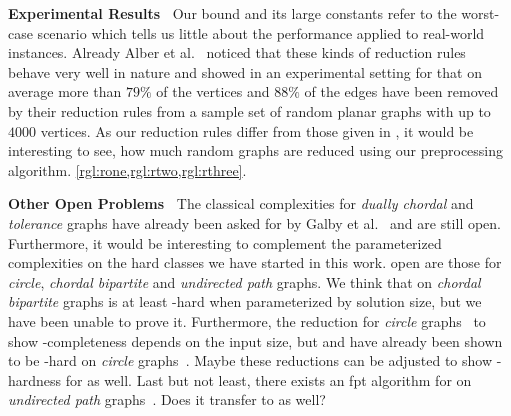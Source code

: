 \noindent \textbf{Experimental Results~}
Our bound and its large constants refer to the worst-case scenario which tells us little about the performance applied to real-world instances.
Already Alber et al.~\cite{Alber2004} noticed that these kinds of reduction rules behave very well in nature and showed in an experimental setting for \pdom that on average more than $79\%$ of the vertices and $88\%$ of the edges have been removed by their reduction rules from a sample set of random planar graphs with up to $4000$ vertices. 
As our reduction rules differ from those given in \cite{Alber2004}, it would be interesting to see, how much random graphs are reduced using our preprocessing algorithm. \cref{rgl:rone,rgl:rtwo,rgl:rthree}.

\noindent \textbf{Other Open Problems~}
The classical complexities for \textit{dually chordal} and \textit{tolerance} graphs have already been asked for by Galby et al.~\cite{Galby2020} and are still open.
Furthermore, it would be interesting to complement the parameterized complexities on the hard classes we have started in this work.
open are those for \textit{circle}, \textit{chordal bipartite} and \textit{undirected path} graphs.
We think that \sdoms on \textit{chordal bipartite} graphs is at least \WONEhs-hard when parameterized by solution size, but we have been unable to prove it.
Furthermore, the reduction for \textit{circle} graphs~\cite{Kloks2021} to show \NP-completeness depends on the input size, but \doms and \tdoms have already been shown to be \WONEhs-hard on \textit{circle} graphs~\cite{Bousquet2012}. 
Maybe these reductions can be adjusted to show \WONEhs-hardness for \sdoms as well.
Last but not least, there exists an fpt algorithm for \doms on \textit{undirected path} graphs~\cite{Figueiredo2022}. 
Does it transfer to \sdoms as well?